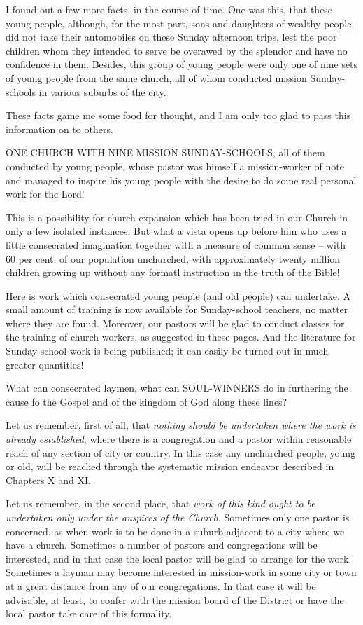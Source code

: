 \documentclass[
]{book}
\begin{document}
I found out a few more facts, in the course of time. One was this, that these young people, although, for the most part, sons and daughters of wealthy people, did not take their automobiles on these Sunday afternoon trips, lest the poor children whom they intended to serve be overawed by the splendor and have no confidence in them. Besides, this group of young people were only one of nine sets of young people from the same church, all of whom conducted mission Sunday-schools in various suburbs of the city.

These facts game me some food for thought, and I am only too glad to pass this information on to others.

ONE CHURCH WITH NINE MISSION SUNDAY-SCHOOLS, all of them conducted by young people, whose pastor was himself a mission-worker of note and managed to inspire his young people with the desire to do some real personal work for the Lord!

This is a possibility for church expansion which has been tried in our Church in only a few isolated instances. But what a vista opens up before him who uses a little consecrated imagination together with a measure of common sense -- with 60 per cent. of our population unchurched, with approximately twenty million children growing up without any formatl instruction in the truth of the Bible!

Here is work which consecrated young people (and old people) can undertake. A small amount of training is now available for Sunday-school teachers, no matter where they are found. Moreover, our pastors will be glad to conduct classes for the training of church-workers, as suggested in these pages. And the literature for Sunday-school work is being published; it can easily be turned out in much greater quantities!

What can consecrated laymen, what can SOUL-WINNERS do in furthering the cause fo the Gospel and of the kingdom of God along these lines?

Let us remember, first of all, that \emph{nothing should be undertaken where the work is already established}, where there is a congregation and a pastor within reasonable reach of any section of city or country. In this case any unchurched people, young or old, will be reached through the systematic mission endeavor described in Chapters X and XI.

Let us remember, in the second place, that \emph{work of this kind ought to be undertaken only under the auspices of the Church}. Sometimes only one pastor is concerned, as when work is to be done in a suburb adjacent to a city where we have a church. Sometimes a number of pastors and congregations will be interested, and in that case the local pastor will be glad to arrange for the work. Sometimes a layman may become interested in mission-work in some city or town at a great distance from any of our congregations. In that case it will be advisable, at least, to confer with the mission board of the District or have the local pastor take care of this formality.
\end{document}
